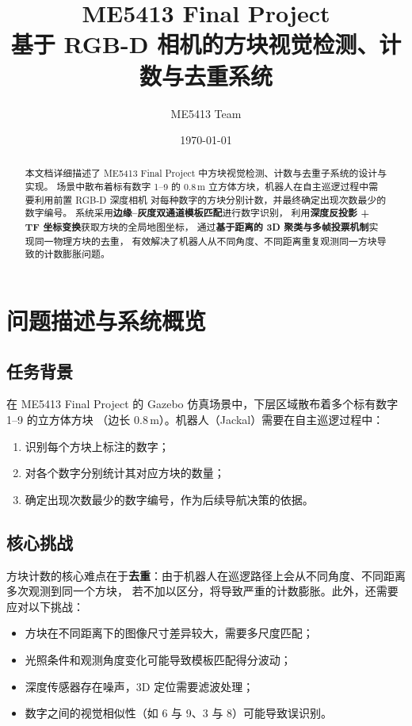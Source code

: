\documentclass[12pt,a4paper]{article}
\title{\textbf{ME5413 Final Project\\基于 RGB-D 相机的方块视觉检测、计数与去重系统}}
\author{ME5413 Team}
\date{\today}
\begin{document}
\maketitle

\begin{abstract}
本文档详细描述了 ME5413 Final Project 中方块视觉检测、计数与去重子系统的设计与实现。
场景中散布着标有数字 1--9 的 0.8\,m 立方体方块，机器人在自主巡逻过程中需要利用前置 RGB-D 深度相机
对每种数字的方块分别计数，并最终确定出现次数最少的数字编号。
系统采用\textbf{边缘--灰度双通道模板匹配}进行数字识别，
利用\textbf{深度反投影 + TF 坐标变换}获取方块的全局地图坐标，
通过\textbf{基于距离的 3D 聚类与多帧投票机制}实现同一物理方块的去重，
有效解决了机器人从不同角度、不同距离重复观测同一方块导致的计数膨胀问题。
\end{abstract}

\tableofcontents
\newpage

\section{问题描述与系统概览}

\subsection{任务背景}

在 ME5413 Final Project 的 Gazebo 仿真场景中，下层区域散布着多个标有数字 1--9 的立方体方块
（边长 0.8\,m）。机器人（Jackal）需要在自主巡逻过程中：

\begin{enumerate}[label=(\arabic*)]
  \item 识别每个方块上标注的数字；
  \item 对各个数字分别统计其对应方块的数量；
  \item 确定出现次数最少的数字编号，作为后续导航决策的依据。
\end{enumerate}

\subsection{核心挑战}

方块计数的核心难点在于\textbf{去重}：由于机器人在巡逻路径上会从不同角度、不同距离多次观测到同一个方块，
若不加以区分，将导致严重的计数膨胀。此外，还需要应对以下挑战：

\begin{itemize}
  \item 方块在不同距离下的图像尺寸差异较大，需要多尺度匹配；
  \item 光照条件和观测角度变化可能导致模板匹配得分波动；
  \item 深度传感器存在噪声，3D 定位需要滤波处理；
  \item 数字之间的视觉相似性（如 6 与 9、3 与 8）可能导致误识别。
\end{itemize}
\end{document}
